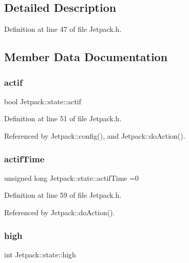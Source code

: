 \subsection{Detailed Description}


Definition at line 47 of file Jetpack.\+h.



\subsection{Member Data Documentation}
\mbox{\label{structJetpack_1_1state_aa177541689bbaea21a4650a083b0df77}} 
\subsubsection{\texorpdfstring{actif}{actif}}
{\footnotesize\ttfamily bool Jetpack\+::state\+::actif}



Definition at line 51 of file Jetpack.\+h.



Referenced by Jetpack\+::config(), and Jetpack\+::do\+Action().

\mbox{\label{structJetpack_1_1state_af2e1cc323ef9ffcc3cf4d203f85d726b}} 
\subsubsection{\texorpdfstring{actif\+Time}{actifTime}}
{\footnotesize\ttfamily unsigned long Jetpack\+::state\+::actif\+Time =0}



Definition at line 59 of file Jetpack.\+h.



Referenced by Jetpack\+::do\+Action().

\mbox{\label{structJetpack_1_1state_a54cc9291c7cc30102a07fd2b0ccd8dde}} 
\subsubsection{\texorpdfstring{high}{high}}
{\footnotesize\ttfamily int Jetpack\+::state\+::high}




